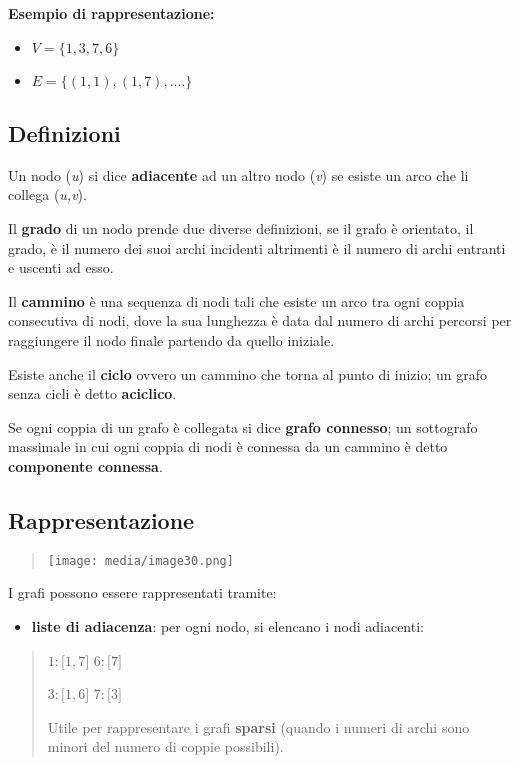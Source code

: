 \textbf{Esempio di rappresentazione:}

\begin{itemize}
\item
  \(V = \{ 1,3,7,6\}\)
\item
  \(E = \{(1,1),(1,7),....\}\)
\end{itemize}

\subsection{Definizioni}\label{definizioni}

Un nodo (\emph{u}) si dice \textbf{adiacente} ad un altro nodo
(\emph{v}) se esiste un arco che li collega (\emph{u,v}).

Il \textbf{grado} di un nodo prende due diverse definizioni, se il grafo
è orientato, il grado, è il numero dei suoi archi incidenti altrimenti è
il numero di archi entranti e uscenti ad esso.

Il \textbf{cammino} è una sequenza di nodi tali che esiste un arco tra
ogni coppia consecutiva di nodi, dove la sua lunghezza è data dal numero
di archi percorsi per raggiungere il nodo finale partendo da quello
iniziale.

Esiste anche il \textbf{ciclo} ovvero un cammino che torna al punto di
inizio; un grafo senza cicli è detto \textbf{aciclico}.

Se ogni coppia di un grafo è collegata si dice \textbf{grafo connesso};
un sottografo massimale in cui ogni coppia di nodi è connessa da un
cammino è detto \textbf{componente connessa}.

\subsection{Rappresentazione}\label{rappresentazione}

\begin{quote}
\texttt{[image: media/image30.png]}
\end{quote}

I grafi possono essere rappresentati tramite:

\begin{itemize}
\item
  \textbf{liste di adiacenza}: per ogni nodo, si elencano i nodi
  adiacenti:
\end{itemize}

\begin{quote}
\(1:\lbrack 1,7\rbrack\) \(6:\lbrack 7\rbrack\)

\(3:\lbrack 1,6\rbrack\) \(7:\lbrack 3\rbrack\)

Utile per rappresentare i grafi \textbf{sparsi} (quando i numeri di
archi sono minori del numero di coppie possibili).
\end{quote}

